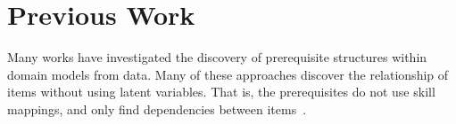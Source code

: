\documentclass{edm_template}
\begin{document}
%


\section{Previous Work}
\label{sec:previous_work}
Many works have investigated the discovery of prerequisite structures within domain models from data.
Many of these approaches discover the relationship of items without using latent variables.
That is, the prerequisites do not use skill mappings, 
and only find dependencies between items~\cite{desmarais2006learned,vuong2010method,piech2015deep}.
  
\end{document}
